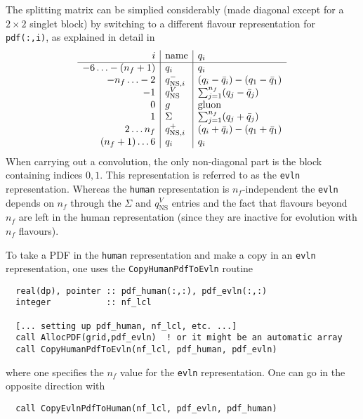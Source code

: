 \documentclass[12pt]{article}
\newcommand{\ttt}[1]{\texttt{#1}}
\begin{document}
The splitting matrix can be simplied considerably (made diagonal
except for a $2\times2$ singlet block) by switching to a different
flavour representation for \ttt{pdf(:,i)}, as explained in detail in
\cite{vanNeerven:1999ca,vanNeerven:2000uj}
\begin{equation}
  \label{eq:diag_split}
  \begin{array}{r | l| l }
     i & \mbox{name} & q_i \\ \hline
      -6\ldots-(n_f+1) & q_i & q_i\\
     -n_f\ldots -2 & q_{\mathrm{NS},i}^{-} & (q_i -  {\bar q}_i) - (q_1 - {\bar q}_1)\\
      -1           & q_{\mathrm{NS}}^{V} & \sum_{j=1}^{n_f} (q_j -  {\bar q}_j)\\
       0           & g & \textrm{gluon} \\
       1           & \Sigma & \sum_{j=1}^{n_f} (q_j +  {\bar q}_j)\\
     2\ldots n_f & q_{\mathrm{NS},i}^{+} & (q_i +  {\bar q}_i) - (q_1 + {\bar q}_1)\\
      (n_f+1)\ldots6 & q_i & q_i
  \end{array}
\end{equation}
When carrying out a convolution, the only non-diagonal part is the
block containing indices $0,1$. This representation is referred to as
the \ttt{evln} representation. Whereas the \ttt{human} representation
is $n_f$-independent the \ttt{evln} depends on $n_f$ through the
$\Sigma$ and $q_{\mathrm{NS}}^{V}$ entries and the fact that flavours
beyond $n_f$ are left in the human representation (since they are
inactive for evolution with $n_f$ flavours).

To take a PDF in the \ttt{human} representation and make a copy in an
\ttt{evln} representation, one uses the \ttt{CopyHumanPdfToEvln} routine
\begin{verbatim}
  real(dp), pointer :: pdf_human(:,:), pdf_evln(:,:)
  integer           :: nf_lcl

  [... setting up pdf_human, nf_lcl, etc. ...] 
  call AllocPDF(grid,pdf_evln)  ! or it might be an automatic array
  call CopyHumanPdfToEvln(nf_lcl, pdf_human, pdf_evln)
\end{verbatim}
where one specifies the $n_f$ value for the \ttt{evln} representation.
One can go in the opposite direction with
\begin{verbatim}
  call CopyEvlnPdfToHuman(nf_lcl, pdf_evln, pdf_human)
\end{verbatim}
\end{document}
